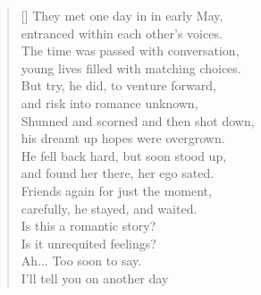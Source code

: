 \documentclass[12pt,oneside,openany]{memoir}
\newcommand{\attrib}[1]{%
\nopagebreak{\raggedleft\footnotesize #1\par}}
\begin{document}
\author{Noah Eisen}
\thispagestyle{empty}

\bigskip
\settowidth{\versewidth}{Their young lives filled with matching choices.}
\begin{verse}[\versewidth]
They met one day in in early May,\\
\vin entranced within each other’s voices.\\
The time was passed with conversation,\\
\vin young lives filled with matching choices.\\
\bigskip
But try, he did, to venture forward,\\
\vin and risk into romance unknown,\\
Shunned and scorned and then shot down,\\
\vin his dreamt up hopes were overgrown.\\
\bigskip
He fell back hard, but soon stood up,\\
\vin and found her there, her ego sated.\\
Friends again for just the moment,\\
\vin carefully, he stayed, and waited.\\
\bigskip
\vin Is this a romantic story? \\
\vin \vin \vin Is it unrequited feelings?\\
\bigskip
\vin Ah... Too soon to say.\\
\vin \vin \vin I’ll tell you on another day
\end{verse}
\attrib{Noah Eisen}
\end{document}

